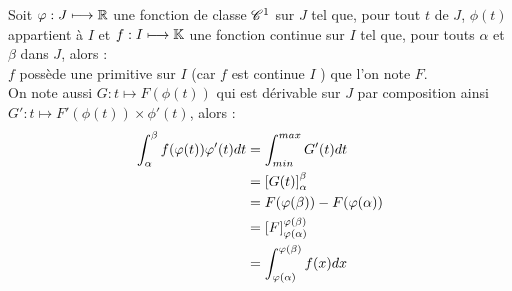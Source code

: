 \begin{dem}
    Soit \(\varphi  :J \longmapsto \mathbb{R}\) une fonction de classe \(\mathscr{C}^{1}\) sur \(J\) tel que, pour tout \(t\) de \(J\), \(\phi(t)\) appartient à \(I\) et \(f  :I\longmapsto \mathbb{K}\) une fonction continue sur \(I\) tel que, pour touts \(\alpha\) et \(\beta\) dans \(J\), alors : \\

    \(f\) possède une primitive sur \(I\) (car \(f\) est continue \(I\) ) que l'on note \(F\). \\
    On note aussi \(G:t\mapsto F(\phi(t))\) qui est dérivable sur \(J\) par composition ainsi \(G':t\mapsto F'(\phi(t))\times \phi'(t)\), alors :
    \[
    \begin{aligned}
        \int_{\alpha}^{\beta} f(\varphi(t))\varphi'(t)dt &= \int_{min}^{max} G'(t)dt \\
        &=\left[G(t)\right]_{\alpha}^{\beta} \\
        &=F(\varphi(\beta)) - F(\varphi(\alpha)) \\
        &= \left[F\right]_{\varphi(\alpha)}^{\varphi(\beta)} \\
        &= \int_{\varphi(\alpha)}^{\varphi(\beta)} f(x)dx
    \end{aligned}
    \]
\end{dem}
